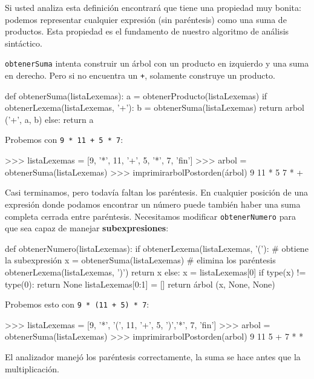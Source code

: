 
Si usted analiza esta definición encontrará que tiene una propiedad
muy bonita: podemos representar cualquier expresión (sin paréntesis)
como una suma de productos. Esta propiedad es el fundamento de nuestro
algoritmo de análisis sintáctico.

\texttt{obtenerSuma} intenta construir un árbol con un producto en
izquierdo y una suma en derecho. Pero si no encuentra un \texttt{+},
solamente construye un producto.

\beforeverb 
\begin{pythoncode}
def obtenerSuma(listaLexemas):
  a = obtenerProducto(listaLexemas)
  if obtenerLexema(listaLexemas, '+'):
    b = obtenerSuma(listaLexemas)
    return arbol ('+', a, b)
  else:
    return a
\end{pythoncode}
\afterverb Probemos con \texttt{9 {*} 11 + 5 {*} 7}:

\beforeverb 
\begin{pyconcode}
>>> listaLexemas = [9, '*', 11, '+', 5, '*', 7, 'fin']
>>> arbol = obtenerSuma(listaLexemas)
>>> imprimirarbolPostorden(árbol)
9 11 * 5 7 * +
\end{pyconcode}
\afterverb Casi terminamos, pero todavía faltan los paréntesis. En
cualquier posición de una expresión donde podamos encontrar un número
puede también haber una suma completa cerrada entre paréntesis. Necesitamos
modificar \texttt{obtenerNumero} para que sea capaz de manejar \textbf{subexpresiones}:


\beforeverb 
\begin{pythoncode}
def obtenerNumero(listaLexemas):
  if obtenerLexema(listaLexemas, '('):
    # obtiene la subexpresión
    x = obtenerSuma(listaLexemas)  
    # elimina los paréntesis
    obtenerLexema(listaLexemas, ')') 
    return x
  else:
    x = listaLexemas[0]
    if type(x) != type(0): 
       return None
    listaLexemas[0:1] = []
    return árbol (x, None, None)    
\end{pythoncode}
\afterverb Probemos esto con \texttt{9 {*} (11 + 5) {*} 7}:

\beforeverb 
\begin{pyconcode}
>>> listaLexemas = [9, '*', '(', 11, '+', 5, ')','*', 7, 
'fin']
>>> arbol = obtenerSuma(listaLexemas)
>>> imprimirarbolPostorden(arbol)
9 11 5 + 7 * *
\end{pyconcode}
\afterverb %

El analizador manejó los paréntesis correctamente, la suma se hace
antes que la multiplicación.

